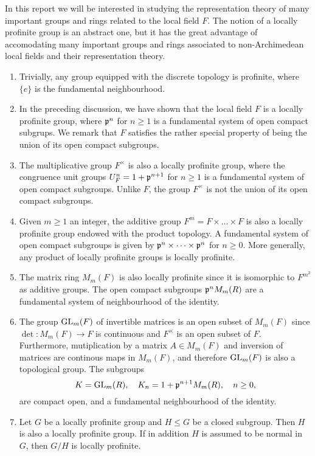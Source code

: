 In this report we will be interested in studying the representation theory of many important groups and rings related to the local field $F$. The notion of a locally profinite group is an abstract one, but it has the great advantage of accomodating many important groups and rings associated to non-Archimedean local fields and their representation theory.

\begin{examples} \label{example_prof_groups}

    \begin{enumerate}
        \item Trivially, any group equipped with the discrete topology is profinite, where $\{e\}$ is the fundamental neighbourhood.
        \item In the preceding discussion, we have shown that the local field $F$ is a locally profinite group, where $\mathfrak{p}^n$ for $n\geq1$ is a fundamental system of open compact subgrups. We remark that $F$ satisfies the rather special property of being the union of its open compact subgroups. %
        \item The multiplicative group $F^{\times}$ is also a locally profinite group, where the congruence unit groups $U_F^n=1+\mathfrak{p}^{n+1}$ for $n\geq1$ is a fundamental system of open compact subgroups. Unlike $F$, the group $F^{\times}$ is not the union of its open compact subgroups.
        \item Given $m\geq1$ an integer, the additive group $F^m=F\times\dots\times F$ is also a locally profinite group endowed with the product topology. A fundamental system of open compact subgroups is given by $\mathfrak{p}^{n}\times\dots\times\mathfrak{p}^{n}$ for $n\geq0$. More generally, any product of locally profinite groups is locally profinite.
        \item The matrix ring $M_m(F)$ is also locally profinite since it is isomorphic to $F^{m^2}$ as additive groups. The open compact subgroups $\mathfrak{p}^n M_m(R)$ are a fundamental system of neighbourhood of the identity.
        \item The group $\mathrm{GL}_m(F)$ of invertible matrices is an open subset of $M_m(F)$ since $\det:M_m(F)\rightarrow F$ is continuous and $F^{\times}$ is an open subset of $F$. Furthermore, mutiplication by a matrix $A\in M_m(F)$ and inversion of matrices are continous maps in $M_m(F)$, and therefore $\mathrm{GL}_m(F)$ is also a topological group. The subgroups
        $$K=\mathrm{GL}_m(R),\quad K_n=1+\mathfrak{p}^{n+1}M_m(R),\quad n\geq 0,$$
        are compact open, and a fundamental neighbourhood of the identity.
        \item Let $G$ be a locally profinite group and $H\leq G$ be a closed subgroup. Then $H$ is also a locally profinite group. If in addition $H$ is assumed to be normal in $G$, then $G/H$ is locally profinite. 
        

\end{enumerate}
\end{examples}
